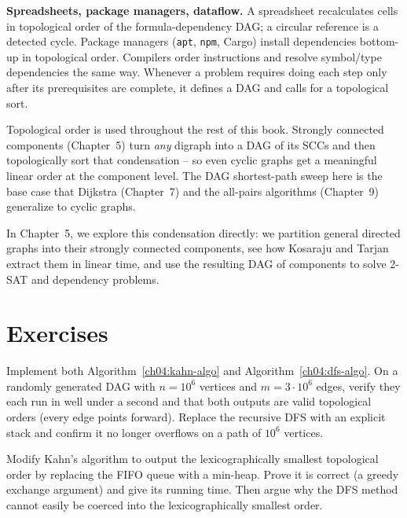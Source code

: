 \begin{applicationbox}
\textbf{Spreadsheets, package managers, dataflow.} A spreadsheet recalculates cells in topological
order of the formula-dependency DAG; a circular reference is a detected cycle. Package managers
(\texttt{apt}, \texttt{npm}, Cargo) install dependencies bottom-up in topological order. Compilers
order instructions and resolve symbol/type dependencies the same way. Whenever a problem requires doing each step only after
its prerequisites are complete, it defines a DAG and calls for a topological sort.
\end{applicationbox}

\begin{connectionbox}
Topological order is used throughout the rest of this book. Strongly connected components
(Chapter~5) turn \emph{any} digraph into a DAG of its SCCs and then topologically sort that
condensation -- so even cyclic graphs get a meaningful linear order at the component level. The DAG
shortest-path sweep here is the base case that Dijkstra (Chapter~7) and the all-pairs algorithms
(Chapter~9) generalize to cyclic graphs.

In Chapter~5, we explore this condensation directly: we partition general directed graphs into
their strongly connected components, see how Kosaraju and Tarjan extract them in linear time,
and use the resulting DAG of components to solve 2-SAT and dependency problems.
\end{connectionbox}

\section{Exercises}

\begin{exercise}
Implement both Algorithm~\ref{ch04:kahn-algo} and Algorithm~\ref{ch04:dfs-algo}. On a randomly
generated DAG with $n=10^6$ vertices and $m=3\cdot 10^6$ edges, verify they each run in well under a
second and that both outputs are valid topological orders (every edge points forward). Replace the
recursive DFS with an explicit stack and confirm it no longer overflows on a path of $10^6$ vertices.
\end{exercise}

\begin{exercise}
Modify Kahn's algorithm to output the lexicographically smallest topological order by replacing the
FIFO queue with a min-heap. Prove it is correct (a greedy exchange argument) and give its running
time. Then argue why the DFS method cannot easily be coerced into the lexicographically smallest
order.
\end{exercise}


